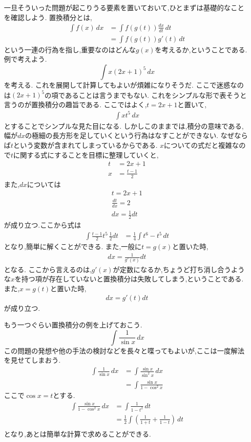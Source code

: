 ﻿\documentclass[dvipdfmx,a4paper,11pt,fleqn]{jsarticle}
\begin{document}
一旦そういった問題が起こりうる要素を置いておいて,ひとまずは基礎的なことを確認しよう.
置換積分とは,
\begin{align*}
  \int f(x) \,dx&= \int f(g(t)) \frac{dx}{dt} \,dt \\ 
  &= \int f(g(t))g'(t) \,dt
\end{align*}
という一連の行為を指し,重要なのはどんな$g(x)$を考えるか,ということである.
例で考えよう.
\[
\int x(2x+1)^5\,dx
\]
を考える.
これを展開して計算してもよいが煩雑になりそうだ.
ここで迷惑なのは$(2x+1)^5$の項であることは言うまでもない.
これをシンプルな形で表そうと言うのが置換積分の趣旨である.
ここではよく,$t=2x+1$と置いて,
\begin{align*}
  \int xt^5\,dx
\end{align*}
とすることでシンプルな見た目になる.
しかしこのままでは,積分の意味である,幅が$dx$の極細の長方形を足していくという行為はなすことができない.
なぜならば$t$という変数が含まれてしまっているからである.
$x$についての式だと複雑なので$t$に関する式にすることを目標に整理していくと,
\begin{align*}
  t&=2x+1\\
  x&=\frac{t-1}{2}
\end{align*}
また,$dx$については
\begin{align*}
  t=2x+1\\
  \frac{dt}{dx}=2\\
  dx=\frac{1}{2}dt
\end{align*}
が成り立つ.ここから式は
\begin{align*}
  \int \frac{t-1}{2}t^5\,\frac{1}{2}dt&=\frac{1}{4}\int t^6 - t^5\,dt
\end{align*}
となり,簡単に解くことができる.
また,一般に$t=g(x)$と置いた時,
\begin{align}
  dx=\frac{1}{g'(x)}dt
\end{align}
となる.
ここから言えるのは,$g'(x)$が定数になるか,ちょうど打ち消し合うような$x$を持つ項が存在していないと置換積分は失敗してしまう,ということである.
また,$x=g(t)$と置いた時,
\begin{align}
  dx={g'(t)}dt
\end{align}
が成り立つ.

もう一つぐらい置換積分の例を上げておこう.
\[
  \int \frac{1}{\sin x}\, dx
\]
この問題の発想や他の手法の検討などを長々と喋ってもよいが,ここは一度解法を見せてしまおう.
\begin{align*}
  \int \frac{1}{\sin x} \, dx&=\int \frac{\sin x}{\sin^2 x} \, dx\\
  &=\int \frac{\sin x}{1- \cos^2 x}
\end{align*}
\hspace{2em}ここで$\cos x = t$とする.
\begin{align*}
  \int \frac{\sin x}{1- \cos^2 x}\,dx&= \int \frac{1}{1- t^2}\, dt\\
  &=\frac{1}{2}\int \left(\frac{1}{1+t} + \frac{1}{1-t}\right)\, dt\\
\end{align*}
となり,あとは簡単な計算で求めることができる.
\end{document}
